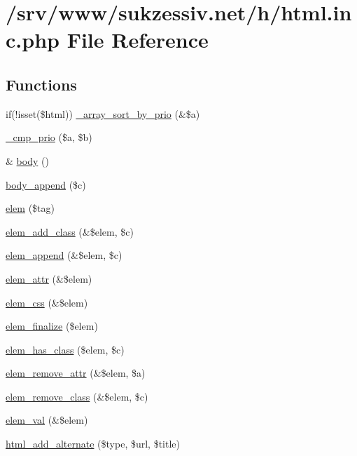 \hypertarget{html_8inc_8php}{
\section{/srv/www/sukzessiv.net/h/html.inc.php File Reference}
\label{html_8inc_8php}
}
\subsection*{Functions}
\begin{CompactItemize}
\item 
if(!isset(\$html)) \hyperlink{html_8inc_8php_7fb2b386b2bae219112628971275c225}{\_\-array\_\-sort\_\-by\_\-prio} (\&\$a)
\item 
\hyperlink{html_8inc_8php_f8ecadff0a4b78867d4da5eae49615e1}{\_\-cmp\_\-prio} (\$a, \$b)
\item 
\& \hyperlink{html_8inc_8php_8b842636055e9a5853a7a10a9e002330}{body} ()
\item 
\hyperlink{html_8inc_8php_d27881abf3a2004d287434d8c8d7cdf6}{body\_\-append} (\$c)
\item 
\hyperlink{html_8inc_8php_a7a1256f84f937f1656195d5ce7b8d91}{elem} (\$tag)
\item 
\hyperlink{html_8inc_8php_afa12d2b690751666e599fb052e19ca6}{elem\_\-add\_\-class} (\&\$elem, \$c)
\item 
\hyperlink{html_8inc_8php_ea37c451f5d55e2efbb2656e340c1dae}{elem\_\-append} (\&\$elem, \$c)
\item 
\hyperlink{html_8inc_8php_894dc22f3b7668c59364599909162b8e}{elem\_\-attr} (\&\$elem)
\item 
\hyperlink{html_8inc_8php_c705ef06deb9e2d49e342ed78ecc1c9a}{elem\_\-css} (\&\$elem)
\item 
\hyperlink{html_8inc_8php_f04b43a4dd09e73ca2cef84a4f2e9381}{elem\_\-finalize} (\$elem)
\item 
\hyperlink{html_8inc_8php_b1019c4b75181c1c1af10e1c1e5e197d}{elem\_\-has\_\-class} (\$elem, \$c)
\item 
\hyperlink{html_8inc_8php_eb7074172d9164f69e64967b6bcdc643}{elem\_\-remove\_\-attr} (\&\$elem, \$a)
\item 
\hyperlink{html_8inc_8php_6a224914e8f32176ca11a31154b1ae13}{elem\_\-remove\_\-class} (\&\$elem, \$c)
\item 
\hyperlink{html_8inc_8php_e28d850c3c906c6884462ca89c06f59b}{elem\_\-val} (\&\$elem)
\item 
\hyperlink{html_8inc_8php_e013e8f0bdd681184ee1873a1964c454}{html\_\-add\_\-alternate} (\$type, \$url, \$title)

\end{CompactItemize}
